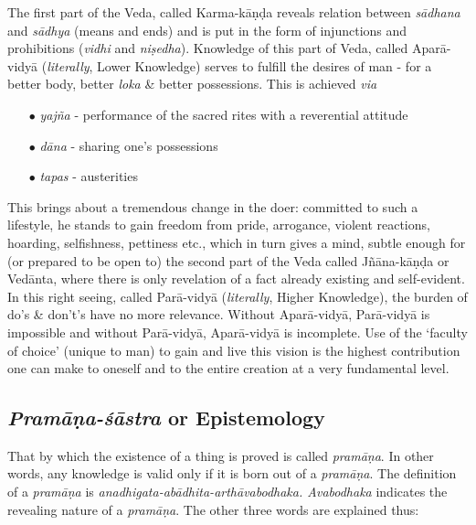 The first part of the Veda, called Karma-kāṇḍa reveals relation between  {\sl sādhana} and {\sl sādhya} (means and ends) and is put in the form of injunctions and prohibitions ({\sl vidhi} and {\sl niṣedha}). Knowledge of this part of Veda, called Aparā-vidyā ({\sl literally}, Lower Knowledge) serves to fulﬁll the desires of man - for a better body, better {\sl loka} \& better possessions. This is achieved {\sl via}
\begin{itemize}
\itemsep=0pt
\item[$\bullet$] {\sl yajña} - performance of the sacred rites with a reverential attitude 
\item[$\bullet$] {\sl dāna} - sharing one's possessions
\item[$\bullet$] {\sl tapas} - austerities 
\end{itemize}
This brings about a tremendous change in the doer: committed to such a lifestyle, he stands to gain freedom from pride, arrogance, violent reactions, hoarding, selﬁshness, pettiness etc., which in turn gives a mind, subtle enough for (or prepared to be open to) the second part of the Veda called Jñāna-kāṇḍa or Vedānta, where there is only revelation of a fact already existing and self-evident. In this right seeing, called Parā-vidyā ({\sl literally}, Higher Knowledge), the burden of do’s \& don't's have no more relevance. Without Aparā-vidyā, Parā-vidyā is impossible and without Parā-vidyā, Aparā-vidyā is incomplete. Use of the `faculty of choice' (unique to man) to gain and live this vision is the highest contribution one can make to oneself and to the entire creation at a very fundamental level.\\[-20pt]

\subsection{{{\sl\bfseries Pramāṇa-śāstra}\relax} or Epistemology}\label{art12-sec2.2}

That by which the existence of a thing is proved is called {\sl pramāṇa}. In other words, any knowledge is valid only if it is born out of a {\sl pramāṇa}. The deﬁnition of a {\sl pramāṇa}  is {\sl anadhigata-abādhita-arthāvabodhaka. Avabodhaka} indicates the revealing nature of a {\sl pramāṇa}. The other three words are explained thus:

